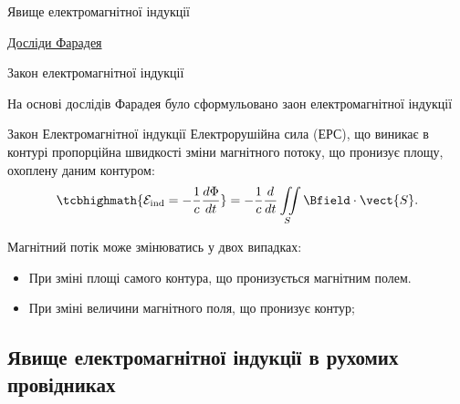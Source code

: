 \documentclass[onlytextwidth]{beamer}
\begin{document}
\begin{frame}{Явище електромагнітної індукції}{}
\begin{overprint}
\begin{center}
\begin{pict}
			\end{pict}
			\href{https://youtu.be/GrBYG8NIUoU}{\color{blue}\small Досліди Фарадея}
		\end{center}
	\end{overprint}
\end{frame}



\begin{frame}{Закон електромагнітної індукції}{}
	\begin{block}{}
		На основі дослідів Фарадея було сформульовано заон електромагнітної індукції
	\end{block}
	\begin{block}{Закон Електромагнітної індукції}\justifying
		Електрорушійна сила (ЕРС), що виникає в контурі пропорційна швидкості зміни магнітного потоку, що пронизує площу, охоплену даним контуром:
		\begin{equation*}
			\tcbhighmath{\mathcal{E}_\text{ind} =  -\frac1c \frac{d\Phi}{dt}} = -\frac1c \frac{d}{dt} \iint\limits_S \Bfield\cdot\vect{S}.
		\end{equation*}
	\end{block}
	\begin{block}{}
		Магнітний потік може змінюватись  у двох випадках:
		\begin{itemize}
			\item При зміні площі самого контура, що пронизується магнітним полем.
			\item При зміні величини магнітного поля, що пронизує контур;
		\end{itemize}
	\end{block}
\end{frame}


\subsection{Явище електромагнітної індукції в рухомих провідниках}
\end{document}
